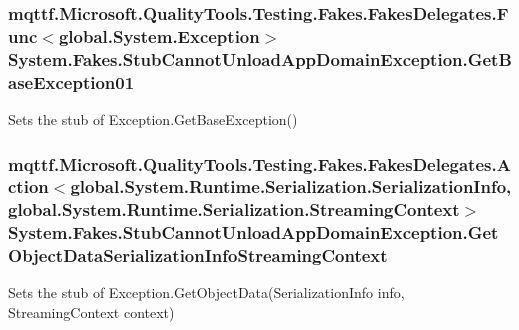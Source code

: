 \hypertarget{class_system_1_1_fakes_1_1_stub_cannot_unload_app_domain_exception_adef249e355b5e51c5f6e74124f2131e0}{
\subsubsection[{Get\-Base\-Exception01}]{\setlength{\rightskip}{0pt plus 5cm}mqttf.\-Microsoft.\-Quality\-Tools.\-Testing.\-Fakes.\-Fakes\-Delegates.\-Func$<$global.\-System.\-Exception$>$ System.\-Fakes.\-Stub\-Cannot\-Unload\-App\-Domain\-Exception.\-Get\-Base\-Exception01}}\label{class_system_1_1_fakes_1_1_stub_cannot_unload_app_domain_exception_adef249e355b5e51c5f6e74124f2131e0}


Sets the stub of Exception.\-Get\-Base\-Exception()

\hypertarget{class_system_1_1_fakes_1_1_stub_cannot_unload_app_domain_exception_a1a1ef39882e0e0022316d155ca544911}{
\subsubsection[{Get\-Object\-Data\-Serialization\-Info\-Streaming\-Context}]{\setlength{\rightskip}{0pt plus 5cm}mqttf.\-Microsoft.\-Quality\-Tools.\-Testing.\-Fakes.\-Fakes\-Delegates.\-Action$<$global.\-System.\-Runtime.\-Serialization.\-Serialization\-Info, global.\-System.\-Runtime.\-Serialization.\-Streaming\-Context$>$ System.\-Fakes.\-Stub\-Cannot\-Unload\-App\-Domain\-Exception.\-Get\-Object\-Data\-Serialization\-Info\-Streaming\-Context}}\label{class_system_1_1_fakes_1_1_stub_cannot_unload_app_domain_exception_a1a1ef39882e0e0022316d155ca544911}


Sets the stub of Exception.\-Get\-Object\-Data(\-Serialization\-Info info, Streaming\-Context context)

